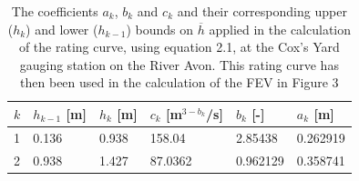 \documentclass[11pt,a4paper]{article}
\begin{document}
\begin{table}[ht!]
\begin{tabular}{l|l|l|l|l|l}
$k$ & $h_{k-1}$ [m] & $h_k$ [m] & $c_k$ [m$^{3-b_k}$/s] & $b_k$ [-] & $a_k$ [m]\\
\hline
1 & 0.136 & 0.938 & 158.04 & 2.85438 & 0.262919 \\
2 & 0.938 & 1.427 & 87.0362 & 0.962129 & 0.358741 \\
\end{tabular}
\caption{The coefficients $a_k$, $b_k$ and $c_k$ and their corresponding upper ($h_k$) and lower ($h_{k-1}$) bounds on $\overline{h}$ \cite{EA} applied in the calculation of the rating curve, using equation 2.1, at the Cox's Yard gauging station on the River Avon. This rating curve has then been used in the calculation of the FEV in Figure 3}
\end{table}
\end{document}
